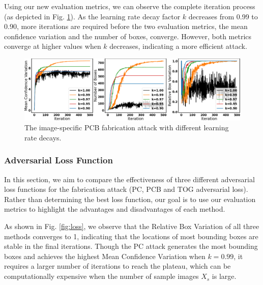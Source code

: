 Using our new evaluation metrics, we can observe the complete iteration process (as depicted in Fig. \ref{fig:decay}). As the learning rate decay factor $k$ decreases from 0.99 to 0.90, more iterations are required before the two evaluation metrics, the mean confidence variation and the number of boxes, converge. However, both metrics converge at higher values when $k$ decreases, indicating a more efficient attack. 


\begin{figure}[H]
    \centering
    \includegraphics[width=\textwidth]{figures/chapter_detection/hardware/lr.png}
    \caption{The  image-specific  PCB fabrication attack with different learning rate decays.}
    \label{fig:decay}
\end{figure}


\subsubsection{Adversarial Loss Function}

In this section, we aim to compare the effectiveness of three different adversarial loss functions for the fabrication attack (PC, PCB and TOG adversarial loss). Rather than determining the best loss function, our goal is to use our evaluation metrics to highlight the advantages and disadvantages of each method.


As shown in Fig. \ref{fig:loss}, we observe that the Relative Box Variation of all three methods converges to 1, indicating that the locations of most bounding boxes are stable in the final iterations. Though the PC attack generates the most bounding boxes and achieves the highest Mean Confidence Variation when $k=0.99$, it requires a larger number of iterations to reach the plateau, which can be computationally expensive when the number of sample images $X_{s}$ is large.

